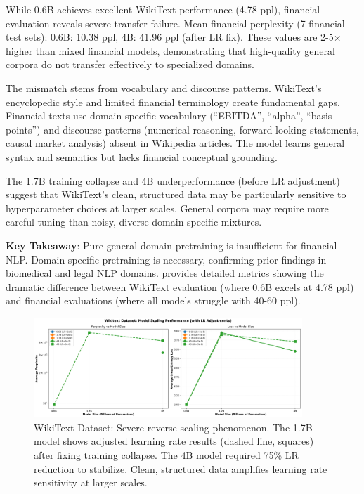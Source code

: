 While 0.6B achieves excellent WikiText performance (4.78 ppl), financial evaluation reveals severe transfer failure. Mean financial perplexity (7 financial test sets): 0.6B: 10.38 ppl, 4B: 41.96 ppl (after LR fix). These values are 2-5$\times$ higher than mixed financial models, demonstrating that high-quality general corpora do not transfer effectively to specialized domains.

The mismatch stems from vocabulary and discourse patterns. WikiText's encyclopedic style and limited financial terminology create fundamental gaps. Financial texts use domain-specific vocabulary (``EBITDA'', ``alpha'', ``basis points'') and discourse patterns (numerical reasoning, forward-looking statements, causal market analysis) absent in Wikipedia articles. The model learns general syntax and semantics but lacks financial conceptual grounding.

The 1.7B training collapse and 4B underperformance (before LR adjustment) suggest that WikiText's clean, structured data may be particularly sensitive to hyperparameter choices at larger scales. General corpora may require more careful tuning than noisy, diverse domain-specific mixtures.

\textbf{Key Takeaway}: Pure general-domain pretraining is insufficient for financial NLP. Domain-specific pretraining is necessary, confirming prior findings in biomedical and legal NLP domains.  provides detailed metrics showing the dramatic difference between WikiText evaluation (where 0.6B excels at 4.78 ppl) and financial evaluations (where all models struggle with 40-60 ppl).

\begin{figure}[htbp]
\centering
\includegraphics[width=0.9\textwidth]{figures/scaling_wikitext.png}
\caption[WikiText Dataset: Reverse Scaling]{WikiText Dataset: Severe reverse scaling phenomenon. The 1.7B model shows adjusted learning rate results (dashed line, squares) after fixing training collapse. The 4B model required 75\% LR reduction to stabilize. Clean, structured data amplifies learning rate sensitivity at larger scales.}
\label{fig:scaling_wikitext}
\end{figure}

